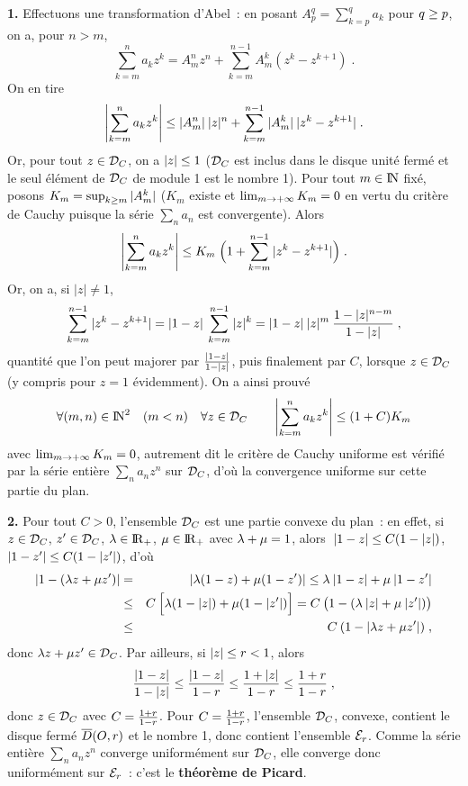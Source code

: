 \documentclass{article}
\begin{document}
\msk
\cl{- - - - - - - - - - - - - - - - - - - - - - - - - - - - - -}
\msk

{\bf 1.} Effectuons une transformation d'Abel~: en posant $A_p^q=\sum_{k=p}^qa_k$ pour $q\geq p$, on a, pour $n>m$,\vv
$$\sum_{k=m}^na_kz^k=A_m^nz^n+\sum_{k=m}^{n-1}A_m^k(z^k-z^{k+1})\;.$$
On en tire\vv
$$\left|\sum_{k=m}^na_kz^k\right|\leq|A_m^n|\>|z|^n+\sum_{k=m}^{n-1}|A_m^k|\>|z^k-z^{k+1}|\;.$$
Or, pour tout $z\in{\cal D}_C$, on a $|z|\leq 1$ (${\cal D}_C$ est inclus dans le disque unit\'e ferm\'e et le seul \'el\'ement de ${\cal D}_C$ de module 1 est le nombre 1).\ssk\sect
Pour tout $m\in{\rm I\kern-0.5mm N}$ fix\'e, posons $K_m=\sup_{k\geq m}|A_m^k|$ ($K_m$ existe et $\lim_{m\rightarrow+\infty}K_m=0$ en vertu du crit\`ere de Cauchy puisque la s\'erie $\sum_na_n$ est convergente). Alors\vv
$$\left|\sum_{k=m}^na_kz^k\right|\leq K_m\;\Big(1+\sum_{k=m}^{n-1}|z^k-z^{k+1}|\Big)\;.$$
Or, on a, si $|z|\not=1$,\vv
$$\sum_{k=m}^{n-1}|z^k-z^{k+1}|=|1-z|\>\sum_{k=m}^{n-1}|z|^k=|1-z|\>|z|^m\>{1-|z|^{n-m}\over 1-|z|}\;,$$
quantit\'e que l'on peut majorer par ${|1-z|\over1-|z|}$, puis finalement par $C$, lorsque $z\in{\cal D}_C$\break (y compris pour $z=1$ \'evidemment). On a ainsi prouv\'e\vv
$$\forall (m,n)\in{\rm I\kern-0.5mm N}^2\quad(m<n)\quad\forall z\in{\cal D}_C\qquad \left|\sum_{k=m}^na_kz^k\right|\leq(1+C)K_m$$
avec $\lim_{m\rightarrow+\infty}K_m=0$, autrement dit le crit\`ere de Cauchy uniforme est v\'erifi\'e par la s\'erie enti\`ere $\sum_na_nz^n$ sur ${\cal D}_C$, d'o\`u la convergence uniforme sur cette partie du plan.

\msk
{\bf 2.} Pour tout $C>0$, l'ensemble ${\cal D}_C$ est une partie convexe du plan~: en effet, si $z\in{\cal D}_C$, $z'\in{\cal D}_C$, $\lambda\in{\rm I\kern-0.6mm R}_+$, $\mu\in{\rm I\kern-0.6mm R}_+$ avec $\lambda+\mu=1$, alors
$\;|1-z|\leq C(1-|z|)$, $|1-z'|\leq C(1-|z'|)$, d'o\`u\vv
\begin{eqnarray*}
|1-(\lambda z+\mu z')| & = & |\lambda(1-z)+\mu(1-z')| \leq \lambda\>|1-z|+\mu\>|1-z'|\\
                           & \leq & C\>\Big[\lambda(1-|z|)+\mu(1-|z'|)\Big] = C\>\big(1-(\lambda\>|z|+\mu\>|z'|)\big)\\
                           & \leq & C\>(1-|\lambda z+\mu z'|)\;,
\end{eqnarray*}
donc $\lambda z+\mu z'\in{\cal D}_C$.
\ssk\sect
Par ailleurs, si $|z|\leq r<1$, alors\vv
$${|1-z|\over 1-|z|}\leq{|1-z|\over1-r}\leq {1+|z|\over1-r}\leq{1+r\over1-r}\;,$$
donc $z\in{\cal D}_C$ avec $C={1+r\over 1-r}$. Pour $C={1+r\over 1-r}$, l'ensemble ${\cal D}_C$, convexe, contient le disque ferm\'e $\overline{D}(O,r)$ et le nombre 1, donc contient l'ensemble ${\cal E}_r$. Comme la s\'erie enti\`ere $\sum_na_nz^n$ converge uniform\'ement sur ${\cal D}_C$, elle converge donc uniform\'ement sur ${\cal E}_r$~: c'est le {\bf th\'eor\`eme de Picard}.
\end{document}
